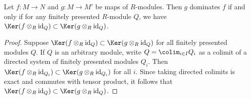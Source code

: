 \begin{lemma}
\label{lemma-domination-fp}
Let $f: M \to N$ and $g: M \to M'$ be maps of $R$-modules.
Then $g$ dominates $f$ if and only if for any finitely presented $R$-module
$Q$, we have $\Ker(f \otimes_R \text{id}_Q) \subset \Ker(g \otimes_R
\text{id}_Q)$.
\end{lemma}

\begin{proof}
Suppose $\Ker(f \otimes_R \text{id}_Q) \subset \Ker(g \otimes_R
\text{id}_Q)$ for all finitely presented modules $Q$.  If $Q$ is an
arbitrary module, write $Q = \colim_{i \in I} Q_i$ as a colimit of a
directed
system of finitely presented modules $Q_i$.  Then $\Ker(f \otimes_R
\text{id}_{Q_i}) \subset \Ker(g \otimes_R \text{id}_{Q_i})$ for
all $i$.  Since taking directed colimits is exact and commutes with tensor
product, it follows that $\Ker(f \otimes_R \text{id}_Q) \subset \Ker(g
\otimes_R \text{id}_Q)$.
\end{proof}
